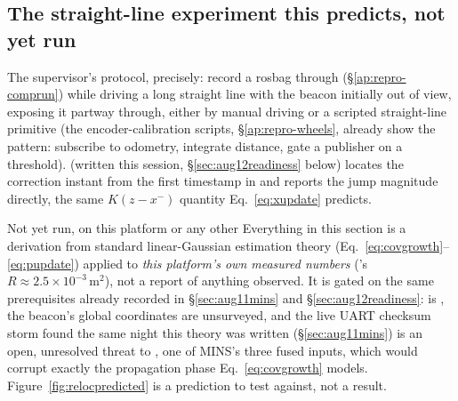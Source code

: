 \subsection{The straight-line experiment this predicts, not yet run}
\label{sec:relocexp}
The supervisor's protocol, precisely: record a rosbag through
 (\S\ref{ap:repro-comprun}) while
driving a long straight line with the beacon initially out of view, exposing
it partway through, either by manual driving or a scripted straight-line
primitive (the encoder-calibration scripts, \S\ref{ap:repro-wheels}, already
show the pattern: subscribe to odometry, integrate distance, gate a
 publisher on a threshold). 
(written this session, \S\ref{sec:aug12readiness} below) locates the
correction instant from the first timestamp in  and
reports the jump magnitude directly, the same $K(z-x^{-})$ quantity
Eq.~\ref{eq:xupdate} predicts.

\begin{trapbox}{Not yet run, on this platform or any other}
Everything in this section is a derivation from standard linear-Gaussian
estimation theory (Eq.~\ref{eq:covgrowth}--\ref{eq:pupdate}) applied to
\emph{this platform's own measured numbers} ('s
$R\approx2.5\times10^{-3}\,\text{m}^2$), not a report of anything observed.
It is gated on the same prerequisites already recorded in
\S\ref{sec:aug11mins} and \S\ref{sec:aug12readiness}: 
is , the beacon's global coordinates are unsurveyed, and the
live UART checksum storm found the same night this theory was written
(\S\ref{sec:aug11mins}) is an open, unresolved threat to
, one of MINS's three fused inputs, which
would corrupt exactly the propagation phase Eq.~\ref{eq:covgrowth} models.
Figure~\ref{fig:relocpredicted} is a prediction to test against, not a
result.
\end{trapbox}

